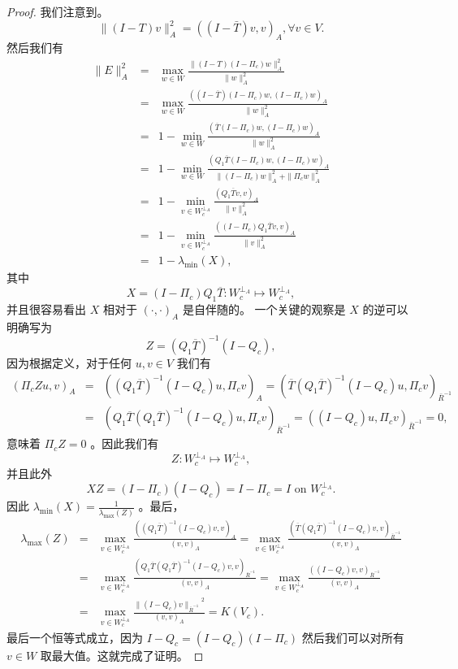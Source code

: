 \documentclass[12pt]{acta_2011xz}
\newcommand{\Tscalar}[2]{\ensuremath{(#1 , #2)_{\bar R^{-1}}}}
\newcommand{\Tnorm}[1]{\ensuremath{\|#1\|_{\bar R^{-1}}}}
\newcommand{\Tproj}{\ensuremath{Q_c}}
\begin{document}
   \begin{proof}我们注意到。
   $$
\|(I-T)v\|_A^2=((I-\bar T)v,v)_A, \forall v\in V. 
$$    然后我们有
   \begin{eqnarray*}
    \|E\|_A^2  &=&  \max\limits_{w\in W}\frac{\|(I-T)(I-\Pi_c)w\|_A^2}{\|w\|_A^2} \\ 
    &= &\max\limits_{w\in W}\frac{((I-\overline{T})(I-\Pi_c)w,(I-\Pi_c) w)_A}{\|w\|_A^2} \\ 
    &= &1-\min\limits_{w\in W}\frac{(\overline{T}(I-\Pi_c)w, (I-\Pi_c) w)_A}{\|w\|_A^2} \\ 
    &= &1-\min\limits_{w\in W}\frac{(Q_1\overline{T}(I-\Pi_c)w, (I-\Pi_c)w)_A}{\|(I-\Pi_c)w\|_A^2+ \|\Pi_cw\|_A^2} \\ 
    & = & 1-\min\limits_{v\in W_c^{\perp_A}}\frac{(Q_1\overline{T}v,v)_A}{\|v\|_A^2}  \\ 
    & = & 1-\min\limits_{v\in W_c^{\perp_A}}\frac{((I-\Pi_c)Q_1\overline{T}v,v)_A}{\|v\|_A^2}  \\ 
    & = &1- \lambda_{\min{}}(X),
\end{eqnarray*}    其中
   $$
X=(I-\Pi_c)Q_1\overline{T}: W_c^{\perp_A}\mapsto W_c^{\perp_A},
$$    并且很容易看出    $X$    相对于
   $(\cdot,\cdot)_A$    是自伴随的。
一个关键的观察是    $X$    的逆可以明确写为
   $$
    Z = (Q_1\overline{T})^{-1}(I-\Tproj),
$$    因为根据定义，对于任何    $u, v\in V$    我们有
   \begin{eqnarray*}
        (\Pi_cZ u, v)_A & =& ((Q_1\overline{T})^{-1}(I-\Tproj)u, \Pi_cv)_A = (\overline T(Q_1\overline T)^{-1}(I-\Tproj)u, \Pi_c v)_{\bar R^{-1}} \\ 
        &=& (Q_1\overline T(Q_1\overline T)^{-1}(I-\Tproj)u, \Pi_c v)_{\bar R^{-1}} =((I-\Tproj)u, \Pi_cv)_{\bar R^{-1}} = 0,
    \end{eqnarray*}    意味着    $\Pi_cZ=0$    。因此我们有
   $$
Z: W_c^{\perp_A}\mapsto W_c^{\perp_A},
$$    并且此外
   $$
XZ= (I-\Pi_c)(I-\Tproj) = I-\Pi_c=I \mbox{ on } W_c^{\perp_A}.
$$    因此    $\lambda_{\min{}}(X) = \frac{1}{\lambda_{\max{}}(Z)}$    。最后，
   \begin{eqnarray*}
    \lambda_{\max{}}(Z) &=& \max_{v\in W_c^{\perp_A}} \frac{((Q_1\overline{T})^{-1}(I-\Tproj)v,v)_A}{(v,v)_A} = \max_{v\in W_c^{\perp_A}} \frac{(\overline T(Q_1\overline{T})^{-1}(I-\Tproj)v,v)_{\bar R^{-1}}}{(v,v)_A}  \\ 
    &=& \max_{v\in W_c^{\perp_A}} \frac{(Q_1\overline T(Q_1\overline{T})^{-1}(I-\Tproj)v,v)_{\bar R^{-1}}}{(v,v)_A}= \max_{v\in W_c^{\perp_A}}
\frac{\Tscalar{(I-\Tproj)v}{v}}{(v,v)_A} \\ 
& = & \max_{v\in W_c^{\perp_A}}\frac{\Tnorm{(I-\Tproj)v}^2}{(v,v)_A} =  K(V_c). 
\end{eqnarray*}    最后一个恒等式成立，因为    $I-\Tproj = (I-\Tproj)(I-\Pi_c)$    然后我们可以对所有    $v\in W$    取最大值。这就完成了证明。  \end{proof}     
\end{document}
